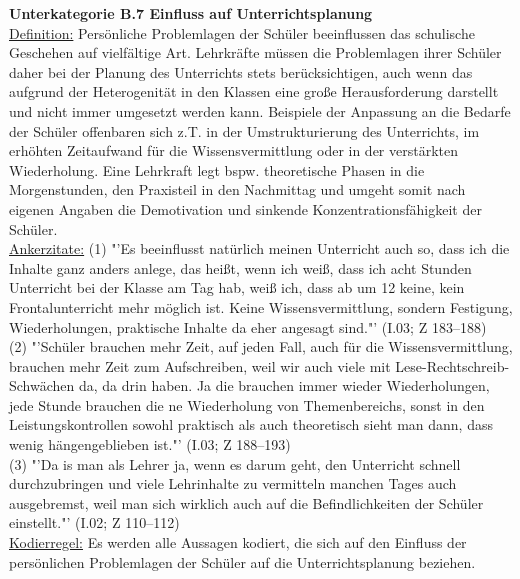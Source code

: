 \noindent
\textbf{Unterkategorie B.7 Einfluss auf Unterrichtsplanung}\\
\underline{Definition:} Persönliche Problemlagen der Schüler beeinflussen das schulische Geschehen auf vielfältige Art. Lehrkräfte müssen die Problemlagen ihrer Schüler daher bei der Planung des Unterrichts stets berücksichtigen, auch wenn das aufgrund der Heterogenität in den Klassen eine große Herausforderung darstellt und nicht immer umgesetzt werden kann. Beispiele der Anpassung an die Bedarfe der Schüler offenbaren sich z.T. in der Umstrukturierung des Unterrichts, im erhöhten Zeitaufwand für die Wissensvermittlung oder in der verstärkten Wiederholung. Eine Lehrkraft legt bspw. theoretische Phasen in die Morgenstunden, den Praxisteil in den Nachmittag und umgeht somit nach eigenen Angaben die Demotivation und sinkende Konzentrationsfähigkeit der Schüler.\\
\underline{Ankerzitate:} (1) "'Es beeinflusst natürlich meinen Unterricht auch so, dass ich die Inhalte ganz anders anlege, das heißt, wenn ich weiß, dass ich acht Stunden Unterricht bei der Klasse am Tag hab, weiß ich, dass ab um 12 keine, kein Frontalunterricht mehr möglich ist. Keine Wissensvermittlung, sondern Festigung, Wiederholungen, praktische Inhalte da eher angesagt sind."' (I.03; Z 183--188)\\ (2) "'Schüler brauchen mehr Zeit, auf jeden Fall, auch für die Wissensvermittlung, brauchen mehr Zeit zum Aufschreiben, weil wir auch viele mit Lese-Rechtschreib-Schwächen da, da drin haben. Ja die brauchen immer wieder Wiederholungen, jede Stunde brauchen die ne Wiederholung von Themenbereichs, sonst in den Leistungskontrollen sowohl praktisch als auch theoretisch sieht man dann, dass wenig hängengeblieben ist."' (I.03; Z 188--193)\\ (3) "'Da is man als Lehrer ja, wenn es darum geht, den Unterricht schnell durchzubringen und viele Lehrinhalte zu vermitteln manchen Tages auch ausgebremst, weil man sich wirklich auch auf die Befindlichkeiten der Schüler einstellt."' (I.02; Z 110--112)\\
\underline{Kodierregel:} Es werden alle Aussagen kodiert, die sich auf den Einfluss der persönlichen Problemlagen der Schüler auf die Unterrichtsplanung beziehen.\\

